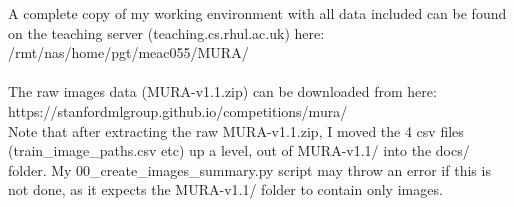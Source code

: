 \documentclass[11pt]{article} %
\theoremstyle{plain}
\theoremstyle{definition}
\begin{document}
\noindent
A complete copy of my working environment with all data included can be found on the teaching server (teaching.cs.rhul.ac.uk) here:
/rmt/nas/home/pgt/meac055/MURA/
\\
\\
\noindent
The raw images data (MURA-v1.1.zip) can be downloaded from here:
https://stanfordmlgroup.github.io/competitions/mura/
\\
\noindent
Note that after extracting the raw MURA-v1.1.zip, I moved the 4 csv files (train\_image\_paths.csv etc) up a level, out of MURA-v1.1/ into the docs/ folder. My 00\_create\_images\_summary.py script may throw an error if this is not done, as it expects the MURA-v1.1/ folder to contain only images. 
\end{document}
